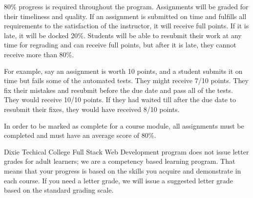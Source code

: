 80\% progress is required throughout the program. Assignments will be graded for their timeliness
and quality. If an assignment is submitted on time and fulfills all requirements to the satisfaction
of the instructor, it will receive full points. If it is late, it will be docked 20\%. Students will
be able to resubmit their work at any time for regrading and can receive full points, but after it is
late, they cannot receive more than 80\%.
\par
\bigskip
For example, say an assignment is worth 10 points, and a student submits it on time but fails some of the
automated tests. They might receive 7/10 points. They fix their mistakes and resubmit before the due date
and pass all of the tests. They would receive 10/10 points. If they had waited till after the due date to
resubmit their fixes, they would have received 8/10 points.
\par
\bigskip
In order to be marked as complete for a course module, all assignments must be completed and must have an
average score of 80\%.
\par
\bigskip
Dixie Techical College Full Stack Web Development program does not issue letter grades for adult learners; we are
a competency based learning program. That means that your progress is based on the skills you acquire
and demonstrate in each course. If you need a letter grade, we will issue a suggested letter grade based
on the standard grading scale.
